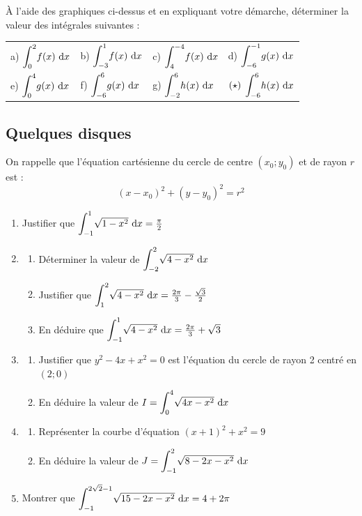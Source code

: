 \documentclass[oneside,12pt]{book}          %
\begin{document}
À l'aide des graphiques ci-dessus et en expliquant votre démarche, déterminer la valeur des intégrales suivantes :

\renewcommand{\arraystretch}{2.5}
\begin{tabular}{p{} p{} p{} p{}}
    a) ${\displaystyle\int_{0}^{2}}f(x){\,\,\mathrm{d}} x$ & b) ${\displaystyle\int_{-3}^{1}}f(x){\,\,\mathrm{d}} x$ & c) ${\displaystyle\int_{4}^{-4}}f(x){\,\,\mathrm{d}} x$ & d) ${\displaystyle\int_{-6}^{-1}}g(x){\,\,\mathrm{d}} x$ \\
    e) ${\displaystyle\int_{0}^{4}}g(x){\,\,\mathrm{d}} x$ & f) ${\displaystyle\int_{-6}^{6}}g(x){\,\,\mathrm{d}} x$ & g) ${\displaystyle\int_{-2}^{6}}h(x){\,\,\mathrm{d}} x$ & ${(\star)}$ ${\displaystyle\int_{-6}^{6}}h(x){\,\,\mathrm{d}} x$
\end{tabular}



\subsection{Quelques disques}
On rappelle que l'équation cartésienne du cercle de centre $(x_0;y_0)$ et de rayon $r$ est : \[(x-x_0)^2+(y-y_0)^2=r^2\]

\begin{enumerate}
	\item Justifier que ${\displaystyle\int_{-1}^{1}}\sqrt{1-x^2}{\,\,\mathrm{d}} x=\frac{\pi}{2}$
	\item \begin{enumerate}
		\item Déterminer la valeur de ${\displaystyle\int_{-2}^{2}}\sqrt{4-x^2}{\,\,\mathrm{d}} x$
		\item Justifier que ${\displaystyle\int_{1}^{2}}\sqrt{4-x^2}{\,\,\mathrm{d}} x=\frac{2\pi}{3}-\frac{\sqrt{3}}{2}$
		\item En déduire que ${\displaystyle\int_{-1}^{1}}\sqrt{4-x^2}{\,\,\mathrm{d}} x=\frac{2\pi}{3}+\sqrt{3}$
	\end{enumerate}
	\item\begin{enumerate}
		\item Justifier que $y^2-4x+x^2=0$ est l'équation du cercle de rayon 2 centré en $(2;0)$
		\item En déduire la valeur de $I={\displaystyle\int_{0}^{4}}\sqrt{4x-x^2}{\,\,\mathrm{d}} x$
	\end{enumerate}
	\item\begin{enumerate}
		\item Représenter la courbe d'équation $(x+1)^2+x^2=9$
		\item En déduire la valeur de $J={\displaystyle\int_{-1}^{2}}\sqrt{8-2x-x^2}{\,\,\mathrm{d}} x$
	\end{enumerate}
	\item Montrer que ${\displaystyle\int_{-1}^{2\sqrt{2}-1}}\sqrt{15-2x-x^2}{\,\,\mathrm{d}} x=4+2\pi$
\end{enumerate}
\end{document}
